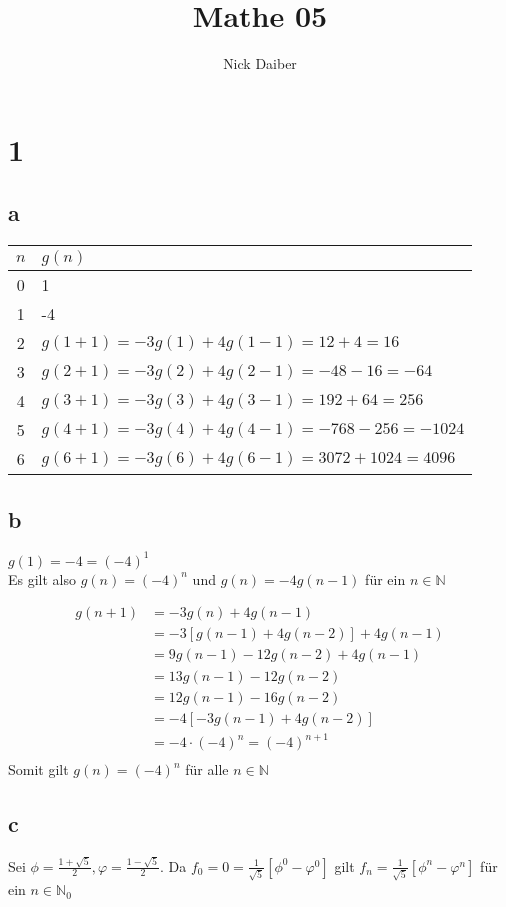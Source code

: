 \documentclass{article}
\author{Nick Daiber}
\title{Mathe 05}
\begin{document}
\maketitle
\section*{1}
\subsection*{a}
\begin{tabular}{c|l}
    \textbf{$n$}&\textbf{$g(n)$}\\
    \hline
    0&1\\
    1&-4\\
    2&$g(1+1)=-3g(1)+4g(1-1)=12+4=16$\\
    3&$g(2+1)=-3g(2)+4g(2-1)=-48-16=-64$\\
    4&$g(3+1)=-3g(3)+4g(3-1)=192+64=256$\\
    5&$g(4+1)=-3g(4)+4g(4-1)=-768-256=-1024$\\
    6&$g(6+1)=-3g(6)+4g(6-1)=3072+1024=4096$
\end{tabular}
\subsection*{b}
$g(1) = -4 = (-4)^1$\\
Es gilt also $g(n) = (-4)^n$ und $g(n) = -4g(n-1)$ für ein $n\in\mathbb N$

\begin{align*}
    g(n+1)&=-3g(n)+4g(n-1)\\
    &=-3[g(n-1)+4g(n-2)]+4g(n-1)\\
    &=9g(n-1)-12g(n-2)+4g(n-1)\\
    &=13g(n-1)-12g(n-2)\\
    &=12g(n-1)-16g(n-2)\\
    &=-4[-3g(n-1)+4g(n-2)]\\
    &=-4\cdot(-4)^n = (-4)^{n+1}\\
\end{align*}
Somit gilt $g(n) = (-4)^n$ für alle $n\in\mathbb N$
\newpage

\subsection*{c}
Sei $ \phi = \frac{1+\sqrt{5}}{2},
\varphi = \frac{1-\sqrt{5}}{2}$.
Da $f_0=0=\frac{1}{\sqrt{5}}[\phi^0-\varphi^0]$
gilt $f_n = \frac{1}{\sqrt{5}}[\phi^n-\varphi^n]$
für ein $n\in\mathbb N_0$
\end{document}
